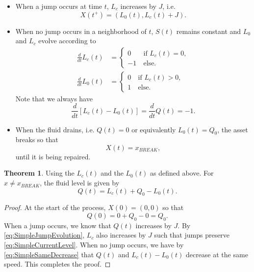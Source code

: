 \documentclass[a4paper]{thesis}
\theoremstyle{definition}
\newtheorem{theorem}{Theorem}[chapter]
\begin{document}
\begin{itemize}
	\item When a jump occurs at time $t$, $L_c$ increases by $J$, i.e.
	\begin{equation}\label{eq:SimpleJumpEvolution}
	X(t^+)=(L_0(t),L_c(t)+J).
	\end{equation}
	\item When no jump occurs in a neighborhood of $t$, $S(t)$ remains constant and $L_0$ and $L_c$ evolve according to
		\begin{equation}\label{eq:SimpleAgeEvolution}
		\begin{split}
		\frac{d}{dt}L_c(t)&=\begin{cases}
		0&\ \text{if }L_c(t)=0,\\
		-1&\ \text{else.}
		\end{cases}\\
		\frac{d}{dt}L_0(t)&=\begin{cases}
		0&\ \text{if }L_c(t)>0,\\
		1&\ \text{else.}
		\end{cases}
		\end{split}
		\end{equation}
		Note that we always have
		\begin{equation}\label{eq:SimpleSameDecrease}
		\frac{d}{dt}\left[L_c(t)-L_0(t)\right]=\frac{d}{dt}Q(t)=-1.
		\end{equation}
	\item When the fluid drains, i.e. $Q(t)=0$ or equivalently $L_0(t)=Q_0$, the asset breaks so that
	\[
	X(t)=x_{BREAK},
	\]
	until it is being repaired.
\end{itemize}
\begin{theorem}\label{theorem:SimpleCurrentLevel}
	Using the $L_c(t)$ and the $L_0(t)$ as defined above.
	For $x\neq x_{BREAK}$, the fluid level is given by
	\begin{equation}\label{eq:SimpleCurrentLevel}
	Q(t)=L_c(t)+Q_0-L_0(t).
	\end{equation}
	\begin{proof}
		At the start of the process, $X(0)=(0,0)$ so that
		\[
		Q(0)=0+Q_0-0=Q_0.
		\]
		When a jump occurs, we know that $Q(t)$ increases by $J$.
		By \eqref{eq:SimpleJumpEvolution}, $L_c$ also increases by $J$ such that jumps preserve \eqref{eq:SimpleCurrentLevel}.
		When no jump occurs, we have by \eqref{eq:SimpleSameDecrease} that $Q(t)$ and $L_c(t)-L_0(t)$ decrease at the same speed.
		This completes the proof.
	\end{proof}
\end{theorem}
\end{document}

